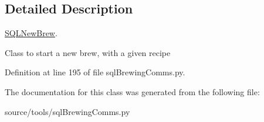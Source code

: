 \subsection{Detailed Description}
\mbox{\hyperlink{classsql_brewing_comms_1_1_s_q_l_new_brew}{S\+Q\+L\+New\+Brew}}. 

Class to start a new brew, with a given recipe 

Definition at line 195 of file sql\+Brewing\+Comms.\+py.



The documentation for this class was generated from the following file\+:\begin{DoxyCompactItemize}
\item 
source/tools/sql\+Brewing\+Comms.\+py\end{DoxyCompactItemize}
